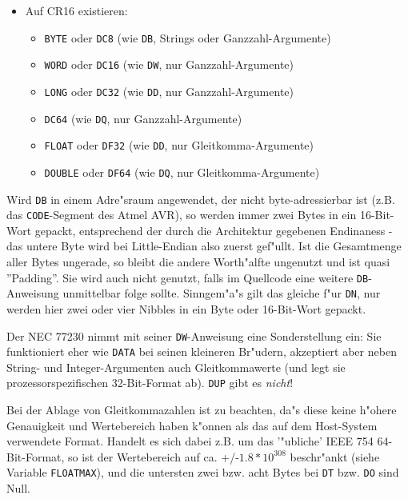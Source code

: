 \documentclass[12pt,a4paper,twoside]{report}
\newcommand{\tty}[1]{{\tt #1}}
\begin{document}
\begin{itemize}
{\begin{itemize}
      \item{\tty{WORD} (wie \tty{DW}, nur Ganzzahl-Argumente)}
      \item{\tty{LWORD} (wie \tty{DD}, nur Ganzzahl-Argumente)}
      \item{\tty{FLOAT} (wie \tty{DD}, nur Gleitkomma-Argumente)}
      \item{\tty{DOUBLE} (wie \tty{DQ}, nur Gleitkomma-Argumente)}
      \end{itemize}}
\item{Auf CR16 existieren:
      \begin{itemize}
      \item{\tty{BYTE} oder \tty{DC8} (wie \tty{DB}, Strings oder Ganzzahl-Argumente)}
      \item{\tty{WORD} oder \tty{DC16} (wie \tty{DW}, nur Ganzzahl-Argumente)}
      \item{\tty{LONG} oder \tty{DC32} (wie \tty{DD}, nur Ganzzahl-Argumente)}
      \item{\tty{DC64} (wie \tty{DQ}, nur Ganzzahl-Argumente)}
      \item{\tty{FLOAT} oder \tty{DF32} (wie \tty{DD}, nur Gleitkomma-Argumente)}
      \item{\tty{DOUBLE} oder \tty{DF64} (wie \tty{DQ}, nur Gleitkomma-Argumente)}
      \end{itemize}}
\end{itemize}

Wird \tty{DB} in einem Adre"sraum angewendet, der nicht byte-adressierbar
ist (z.B. das \tty{CODE}-Segment des Atmel AVR), so werden immer zwei Bytes
in ein 16-Bit-Wort gepackt, entsprechend der durch die Architektur gegebenen
Endinaness - das untere Byte wird bei Little-Endian also zuerst gef"ullt.  Ist
die Gesamtmenge aller Bytes ungerade, so bleibt die andere Worth"alfte ungenutzt
und ist quasi ''Padding''.  Sie wird auch nicht genutzt, falls im Quellcode
eine weitere \tty{DB}-Anweisung unmittelbar folge sollte.  Sinngem"a"s gilt
das gleiche f"ur \tty{DN}, nur werden hier zwei oder vier Nibbles in ein Byte
oder 16-Bit-Wort gepackt.

Der NEC 77230 nimmt mit seiner \tty{DW}-Anweisung eine Sonderstellung ein:
Sie funktioniert eher wie \tty{DATA} bei seinen kleineren Br"udern,
akzeptiert aber neben String- und Integer-Argumenten auch Gleitkommawerte
(und legt sie prozessorspezifischen 32-Bit-Format ab). \tty{DUP} gibt es {\em
nicht}!

Bei der Ablage von Gleitkommazahlen ist zu beachten, da"s diese keine h"ohere
Genauigkeit und Wertebereich haben k"onnen als das auf dem Host-System verwendete
Format.  Handelt es sich dabei z.B. um das '"ubliche' IEEE 754 64-Bit-Format,
so ist der Wertebereich auf ca. +/-$1.8*10^{308}$ beschr"ankt (siehe Variable
\tty{FLOATMAX}), und die untersten zwei bzw. acht Bytes bei \tty{DT} bzw.
\tty{DO} sind Null.
\end{document}
